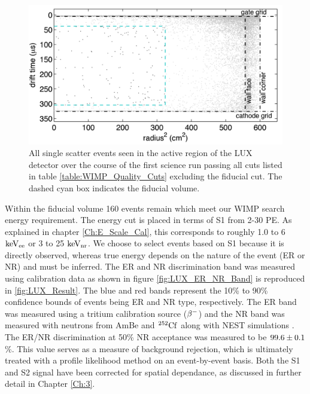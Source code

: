  \begin{figure}[h!]\centering
\includegraphics[width=130mm]{Chapter_LUX_Det/LUX_Result_Event.png}
\caption{All single scatter events seen in the active region of the LUX detector over the course of the first science run passing all cuts listed in table \ref{table:WIMP_Quality_Cuts} excluding the fiducial cut. The dashed cyan box indicates the fiducial volume.}
\label{fig:LUX_Result_Event}
\end{figure}

Within the fiducial volume 160 events remain which meet our WIMP search energy requirement. The energy cut is placed in terms of S1 from 2-30 PE. As explained in chapter \ref{Ch:E_Scale_Cal}, this corresponds to roughly 1.0 to 6 $\rm keV_{ee}$ or 3 to 25 $\rm keV_{nr}$. We choose to select events based on S1 because it is directly observed, whereas true energy depends on the nature of the event (ER or NR) and must be inferred. %
The ER and NR discrimination band was measured using calibration data as shown in figure \ref{fig:LUX_ER_NR_Band} is reproduced in \ref{fig:LUX_Result}. The blue and red bands represent the 10\% to 90\% confidence bounds of events being ER and NR type, respectively. The ER band was measured using a tritium calibration source ($\rm \beta^{-}$) and the NR band was measured with neutrons from AmBe and $\rm^{252}Cf$ along with NEST simulations \cite{NEST_2013}. The ER/NR discrimination at 50\% NR acceptance was measured to be $\rm 99.6\pm0.1$ \%. This value serves as a measure of background rejection, which is ultimately treated with a profile likelihood method on an event-by-event basis. Both the S1 and S2 signal have been corrected for spatial dependance, as discussed in further detail in Chapter \ref{Ch:3}. %

